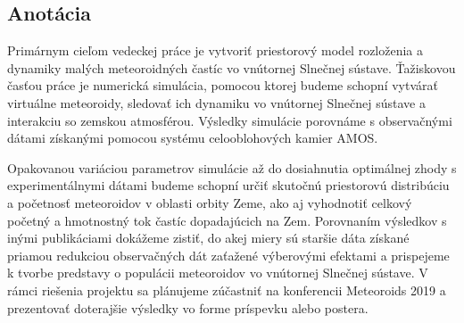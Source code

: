 \hypertarget{anotuxe1cia}{%
\subsection{Anotácia}\label{anotuxe1cia}}

Primárnym cieľom vedeckej práce je vytvoriť priestorový model rozloženia
a dynamiky malých meteoroidných častíc vo vnútornej Slnečnej sústave.
Ťažiskovou časťou práce je numerická simulácia, pomocou ktorej budeme
schopní vytvárať virtuálne meteoroidy, sledovať ich dynamiku vo
vnútornej Slnečnej sústave a interakciu so zemskou atmosférou. Výsledky
simulácie porovnáme s observačnými dátami získanými pomocou systému
celooblohových kamier AMOS.

Opakovanou variáciou parametrov simulácie až do dosiahnutia optimálnej
zhody s experimentálnymi dátami budeme schopní určiť skutočnú
priestorovú distribúciu a početnosť meteoroidov v oblasti orbity Zeme,
ako aj vyhodnotiť celkový početný a hmotnostný tok častíc dopadajúcich
na Zem. Porovnaním výsledkov s inými publikáciami dokážeme zistiť, do
akej miery sú staršie dáta získané priamou redukciou observačných dát
zaťažené výberovými efektami a prispejeme k tvorbe predstavy o populácii
meteoroidov vo vnútornej Slnečnej sústave. V rámci riešenia projektu sa
plánujeme zúčastniť na konferencii Meteoroids 2019 a prezentovať
doterajšie výsledky vo forme príspevku alebo postera.
